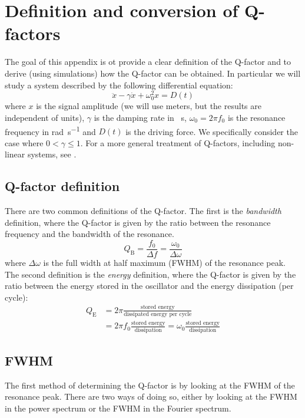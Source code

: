 \chapter{Definition and conversion of Q-factors}
\label{app:q_factors}

The goal of this appendix is ot provide a clear definition of the Q-factor and to derive (using simulations) how the Q-factor can be obtained. In particular we will study a system described by the following differential equation:
\begin{equation}
    \ddot{x} - \gamma \dot{x} + \omega_0^2 x = D(t)
    \tag{damped h.o.}
\end{equation}
where $x$ is the signal amplitude (we will use meters, but the results are independent of units), $\gamma$ is the damping rate in \unit{\per\second}, $\omega_0 = 2\pi f_0$ is the resonance frequency in \unit{\radian\per\second} and $D(t)$ is the driving force. We specifically consider the case where $0 < \gamma \leq 1$. For a more general treatment of Q-factors, including non-linear systems, see \citeauthor{wang_rigorous_2017}.

\section{Q-factor definition}
There are two common definitions of the Q-factor. The first is the \textit{bandwidth} definition, where the Q-factor is given by the ratio between the resonance frequency and the bandwidth of the resonance.
\begin{equation}
    Q_\text{B} = \frac{f_0}{\Delta f} = \frac{\omega_0}{\Delta \omega}
    \tag{bandwidth definition}
\end{equation}
where $\Delta \omega$ is the full width at half maximum (FWHM) of the resonance peak. The second definition is the \textit{energy} definition, where the Q-factor is given by the ratio between the energy stored in the oscillator and the energy dissipation (per cycle):
\begin{align}
    Q_\text{E} &= 2\pi \frac{\text{stored energy}}{\text{dissipated energy per cycle}} \nonumber \\
               &= 2\pi f_0 \frac{\text{stored energy}}{\text{dissipation}} = \omega_0 \frac{\text{stored energy}}{\text{dissipation}} \tag{energy definition}
\end{align}

\section{FWHM}
The first method of determining the Q-factor is by looking at the FWHM of the resonance peak. There are two ways of doing so, either by looking at the FWHM in the power spectrum or the FWHM in the Fourier spectrum.

